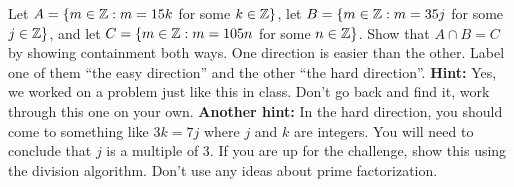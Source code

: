 \item Let $A = \{ m \in \mathbb{Z} : m = 15k$ for some $k \in \mathbb{Z} \}$, let $B = \{ m \in \mathbb{Z} : m = 35j$ for some $j \in \mathbb{Z} \}$, and let $C = \{ m \in \mathbb{Z} : m = 105n$ for some $n \in \mathbb{Z} \}$.
Show that $A \cap B = C$ by showing containment both ways.
One direction is easier than the other.
Label one of them ``the easy direction'' and the other ``the hard direction''.
{\bf Hint:} Yes, we worked on a problem just like this in class.
Don't go back and find it, work through this one on your own.
{\bf Another hint:}  In the hard direction, you should come to something like $3k = 7j$ where $j$ and $k$ are integers.
You will need to conclude that $j$ is a multiple of 3.
If you are up for the challenge, show this using the division algorithm.
Don't use any ideas about prime factorization.
\elist

\vfill          %
